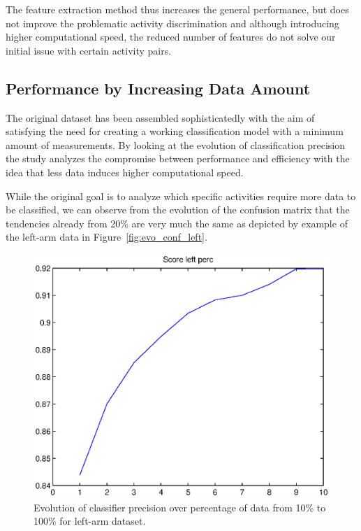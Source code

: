 \documentclass{sig-alternate}
\begin{document}
The feature extraction method thus increases the general performance, but does not improve the problematic activity discrimination and although introducing higher computational speed, the reduced number of features do not solve our initial issue with certain activity pairs.

\subsection{Performance by Increasing Data Amount}
The original dataset has been assembled sophisticatedly with the aim of satisfying the need for creating a working classification model with a minimum amount of measurements. By looking at the evolution of classification precision the study analyzes the compromise between performance and efficiency with the idea that less data induces higher computational speed.

While the original goal is to analyze which specific activities require more data to be classified, we can observe from the evolution of the confusion matrix that the tendencies already from 20\% are very much the same as depicted by example of the left-arm data in Figure~\ref{fig:evo_conf_left}. 


\begin{figure}
  \centering
  \includegraphics[scale=0.45]{./matlab_output/score_perc_left_3.eps}
  \caption{Evolution of classifier precision over percentage of data from 10\% to 100\% for left-arm dataset.}
  \label{fig:score_evo_left}
\end{figure}
\end{document}
